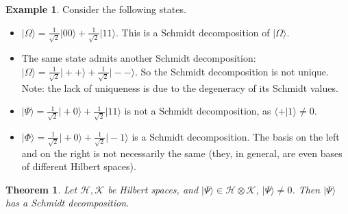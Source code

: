 \documentclass{article}
\newtheorem{theorem}{Theorem}
\theoremstyle{definition}
\newtheorem{example}{Example}
\newcommand{\ket}[1]{\vert #1 \rangle}
\newcommand{\scalprod}[2]{\langle #1 \vert #2 \rangle}
\begin{document}
\begin{example}
  Consider the following states. 
  \begin{itemize}
    \item $\ket{\Omega} = \frac{1}{\sqrt{2}} \ket{00} + \frac{1}{\sqrt{2}} \ket{11}$. This is a Schmidt decomposition of $\ket{\Omega}$.
    \item The same state admits another Schmidt decomposition: $\ket{\Omega} = \frac{1}{\sqrt{2}} \ket{++} + \frac{1}{\sqrt{2}} \ket{--}$. So the Schmidt decomposition is not unique. Note: the lack of uniqueness is due to the degeneracy of its Schmidt values. 
    \item $\ket{\Psi} = \frac{1}{\sqrt{2}} \ket{+0} + \frac{1}{\sqrt{2}} \ket{11}$ is not a Schmidt decomposition, as $\scalprod{+}{1}\neq 0$.
    \item $\ket{\Phi} = \frac{1}{\sqrt{2}} \ket{+0} + \frac{1}{\sqrt{2}} \ket{-1}$ is a Schmidt decomposition. The basis on the left and on the right is not necessarily the same (they, in general, are even bases of different Hilbert spaces).
  \end{itemize}
\end{example}

\begin{theorem}
  Let $\mathcal{H},\mathcal{K}$ be Hilbert spaces, and $\ket{\Psi}\in\mathcal{H}\otimes \mathcal{K}$, $\ket{\Psi}\neq 0$. Then $\ket{\Psi}$ has a Schmidt decomposition.
\end{theorem}
\end{document}

